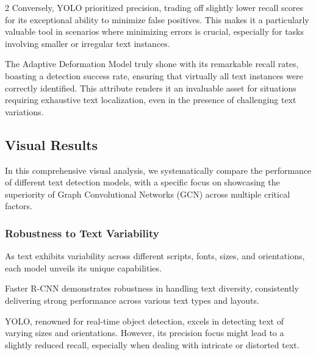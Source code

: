 \documentclass[sn-mathphys,Numbered]{sn-jnl}%
\begin{document}
\begin{multicols}{2}
Conversely, YOLO prioritized precision, trading off slightly lower recall scores for its exceptional ability to minimize false positives. This makes it a particularly valuable tool in scenarios where minimizing errors is crucial, especially for tasks involving smaller or irregular text instances.

The Adaptive Deformation Model truly shone with its remarkable recall rates, boasting a detection success rate, ensuring that virtually all text instances were correctly identified. This attribute renders it an invaluable asset for situations requiring exhaustive text localization, even in the presence of challenging text variations.
\subsection{Visual Results}
In this comprehensive visual analysis, we systematically compare the performance of different text detection models, with a specific focus on showcasing the superiority of Graph Convolutional Networks (GCN) across multiple critical factors.

\subsubsection{Robustness to Text Variability} 
As text exhibits variability across different scripts, fonts, sizes, and orientations, each model unveils its unique capabilities. 

Faster R-CNN demonstrates robustness in handling text diversity, consistently delivering strong performance across various text types and layouts.


YOLO, renowned for real-time object detection, excels in detecting text of varying sizes and orientations. However, its precision focus might lead to a slightly reduced recall, especially when dealing with intricate or distorted text.



\end{multicols}
\end{document}

